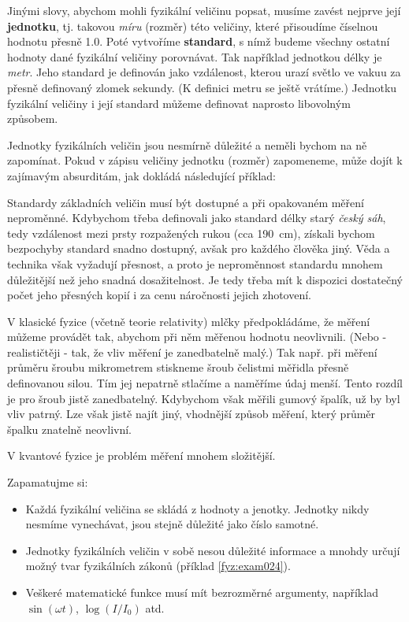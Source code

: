     Jinými slovy, abychom mohli fyzikální veličinu popsat, musíme zavést nejprve její
    \textbf{jednotku}, tj. takovou \emph{míru} (rozměr) této veličiny, které přisoudíme číselnou
    hodnotu přesně \num{1.0}. Poté vytvoříme \textbf{standard}, s nímž budeme všechny ostatní
    hodnoty dané fyzikální veličiny porovnávat. Tak například jednotkou délky je \emph{metr}. Jeho
    standard je definován jako vzdálenost, kterou urazí světlo ve vakuu za přesně definovaný zlomek
    sekundy. (K definici metru se ještě vrátíme.) Jednotku fyzikální veličiny i její standard můžeme
    definovat naprosto libovolným způsobem. 
    
    Jednotky fyzikálních veličin jsou nesmírně důležité a neměli bychom na ně zapomínat. Pokud v
    zápisu veličiny jednotku (rozměr) zapomeneme, může dojít k zajímavým absurditám, jak dokládá
    následující příklad:  

    

    Standardy základních veličin musí být dostupné a při opakovaném měření neproměnné. Kdybychom
    třeba definovali jako standard délky starý \emph{český sáh}, tedy vzdálenost mezi prsty
    rozpažených rukou (cca \SI{190}{\cm}), získali bychom bezpochyby standard snadno dostupný, avšak
    pro každého člověka jiný. Věda a technika však vyžadují přesnost, a proto je neproměnnost
    standardu mnohem důležitější než jeho snadná dosažitelnost. Je tedy třeba mít k dispozici
    dostatečný počet jeho přesných kopií i za cenu náročnosti jejich zhotovení.

    V klasické fyzice (včetně teorie relativity) mlčky předpokládáme, že měření můžeme provádět tak,
    abychom při něm měřenou hodnotu neovlivnili. (Nebo - realističtěji - tak, že vliv měření je
    zanedbatelně malý.) Tak např. při měření průměru šroubu mikrometrem stiskneme šroub čelistmi
    měřidla přesně definovanou silou. Tím jej nepatrně stlačíme a naměříme údaj menší. Tento rozdíl
    je pro šroub jistě zanedbatelný. Kdybychom však měřili gumový špalík, už by byl vliv patrný. Lze
    však jistě najít jiný, vhodnější způsob měření, který průměr špalku znatelně neovlivní. 
    
    V kvantové fyzice je problém měření mnohem složitější.

    \begin{tcnote}      
      Zapamatujme si:
      \begin{itemize}[leftmargin=10pt, noitemsep]
        \item Každá fyzikální veličina se skládá z hodnoty a jenotky. Jednotky nikdy nesmíme
              vynechávat, jsou stejně důležité jako číslo samotné.
        \item Jednotky fyzikálních veličin v sobě nesou důležité informace a mnohdy určují možný tvar
              fyzikálních zákonů (příklad \ref{fyz:exam024}).
        \item Veškeré matematické funkce musí mít bezrozměrné argumenty, například \(\sin(ωt)\),
              \(\log(I/I_0)\) atd.
      \end{itemize}
    \end{tcnote}

